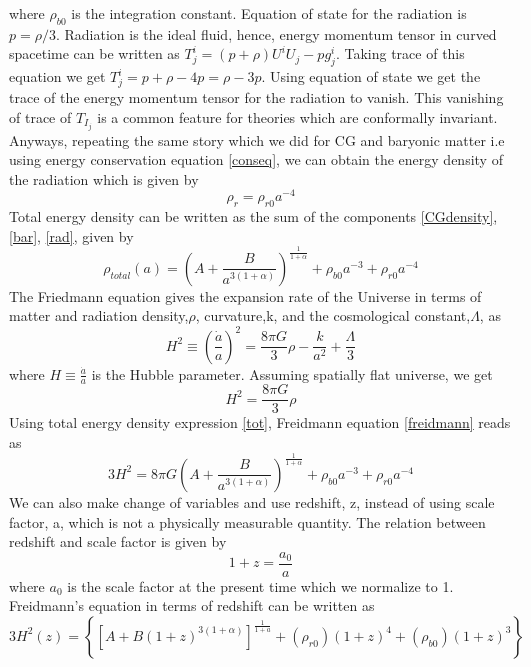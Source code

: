 where $\rho_{b0}$ is the integration constant. Equation of state for the radiation is $p=\rho/3$. Radiation is the ideal fluid, hence, energy momentum tensor in curved spacetime can be written as $T^i_j=(p+\rho) U^i U_j - p g^i_j$. Taking trace of this equation we get $T^i_j= p+\rho -4p=\rho-3p$. Using equation of state we get the trace of the energy momentum tensor for the radiation to vanish. This vanishing of trace of $T_I_j$ is a common feature for theories which are conformally invariant. Anyways, repeating the same story which we did for CG and baryonic matter i.e using energy conservation equation \ref{conseq}, we can obtain the energy density of the radiation which is given by
\begin{equation}\label{rad}
    \rho_r=\rho_{r0}a^{-4}
\end{equation}
Total energy density can be written as the sum of the components \ref{CGdensity}, \ref{bar}, \ref{rad}, given by
\begin{equation}\label{tot}
    \rho_{total}(a)=\left(A+\frac{B}{a^{3(1+\alpha)}}\right)^{\frac{1}{1+\alpha}} + \rho_{b0} a^{-3} + \rho_{r0}a^{-4}
\end{equation}
The Friedmann equation gives the expansion rate of the Universe in terms of matter and radiation density,$\rho$, curvature,k, and the cosmological constant,$\Lambda$, as
\begin{equation}\label{freidmann}
    H^{2} \equiv\left(\frac{\dot{a}}{a}\right)^{2}=\frac{8 \pi G}{3} \rho-\frac{k}{a^{2}}+\frac{\Lambda}{3}
\end{equation}
where $H\equiv \frac{\dot a}{a}$ is the Hubble parameter. Assuming spatially flat universe, we get
\begin{equation}
    H^{2}=\frac{8 \pi G}{3} \rho
\end{equation}
Using total energy density expression \ref{tot}, Freidmann equation \ref{freidmann} reads as
\begin{equation}
    3 H^2= 8\pi G\left(A+\frac{B}{a^{3(1+\alpha)}}\right)^{\frac{1}{1+\alpha}} + \rho_{b0} a^{-3} + \rho_{r0}a^{-4}
\end{equation}
We can also make change of variables and use redshift, z, instead of using scale factor, a, which is not a physically measurable quantity. The relation between redshift and scale factor is given by
\begin{equation}\label{RDZ}
    1+z=\frac{a_0}{a}
\end{equation}
where $a_0$ is the scale factor at the present time which we normalize to 1. Freidmann's equation in terms of redshift can be written as
\begin{equation}\label{Freidredshift}
3 H^{2}(z)=\left\{\left[A+B(1+z)^{3(1+\alpha)}\right]^{\frac{1}{1+a}}+\left(\rho_{r0}\right)(1+z)^{4}+\left(\rho_{b0}\right)(1+z)^{3}\right\}
\end{equation}
